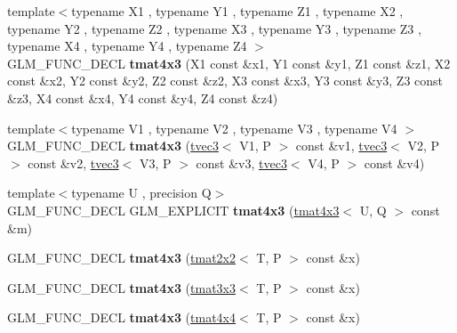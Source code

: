 \begin{DoxyCompactItemize}
\item 
\hypertarget{structglm_1_1tmat4x3_a6374ec605f3a745bec999d9dd6926a8d}{{\footnotesize template$<$typename X1 , typename Y1 , typename Z1 , typename X2 , typename Y2 , typename Z2 , typename X3 , typename Y3 , typename Z3 , typename X4 , typename Y4 , typename Z4 $>$ }\\G\-L\-M\-\_\-\-F\-U\-N\-C\-\_\-\-D\-E\-C\-L {\bfseries tmat4x3} (X1 const \&x1, Y1 const \&y1, Z1 const \&z1, X2 const \&x2, Y2 const \&y2, Z2 const \&z2, X3 const \&x3, Y3 const \&y3, Z3 const \&z3, X4 const \&x4, Y4 const \&y4, Z4 const \&z4)}\label{structglm_1_1tmat4x3_a6374ec605f3a745bec999d9dd6926a8d}

\item 
\hypertarget{structglm_1_1tmat4x3_a69caec1d2cb2b9320817a1323211d94d}{{\footnotesize template$<$typename V1 , typename V2 , typename V3 , typename V4 $>$ }\\G\-L\-M\-\_\-\-F\-U\-N\-C\-\_\-\-D\-E\-C\-L {\bfseries tmat4x3} (\hyperlink{structglm_1_1tvec3}{tvec3}$<$ V1, P $>$ const \&v1, \hyperlink{structglm_1_1tvec3}{tvec3}$<$ V2, P $>$ const \&v2, \hyperlink{structglm_1_1tvec3}{tvec3}$<$ V3, P $>$ const \&v3, \hyperlink{structglm_1_1tvec3}{tvec3}$<$ V4, P $>$ const \&v4)}\label{structglm_1_1tmat4x3_a69caec1d2cb2b9320817a1323211d94d}

\item 
\hypertarget{structglm_1_1tmat4x3_aa0103a8d29b63892bf75c1f28cccfe23}{{\footnotesize template$<$typename U , precision Q$>$ }\\G\-L\-M\-\_\-\-F\-U\-N\-C\-\_\-\-D\-E\-C\-L G\-L\-M\-\_\-\-E\-X\-P\-L\-I\-C\-I\-T {\bfseries tmat4x3} (\hyperlink{structglm_1_1tmat4x3}{tmat4x3}$<$ U, Q $>$ const \&m)}\label{structglm_1_1tmat4x3_aa0103a8d29b63892bf75c1f28cccfe23}

\item 
\hypertarget{structglm_1_1tmat4x3_a0a7982fe88164b1cc7ae9ddac2b62ac0}{G\-L\-M\-\_\-\-F\-U\-N\-C\-\_\-\-D\-E\-C\-L {\bfseries tmat4x3} (\hyperlink{structglm_1_1tmat2x2}{tmat2x2}$<$ T, P $>$ const \&x)}\label{structglm_1_1tmat4x3_a0a7982fe88164b1cc7ae9ddac2b62ac0}

\item 
\hypertarget{structglm_1_1tmat4x3_a28c08dee803c5fb0fe8c2c824f58681d}{G\-L\-M\-\_\-\-F\-U\-N\-C\-\_\-\-D\-E\-C\-L {\bfseries tmat4x3} (\hyperlink{structglm_1_1tmat3x3}{tmat3x3}$<$ T, P $>$ const \&x)}\label{structglm_1_1tmat4x3_a28c08dee803c5fb0fe8c2c824f58681d}

\item 
\hypertarget{structglm_1_1tmat4x3_ad5011e7aaaeddf6ca91742217d07a8d2}{G\-L\-M\-\_\-\-F\-U\-N\-C\-\_\-\-D\-E\-C\-L {\bfseries tmat4x3} (\hyperlink{structglm_1_1tmat4x4}{tmat4x4}$<$ T, P $>$ const \&x)}\label{structglm_1_1tmat4x3_ad5011e7aaaeddf6ca91742217d07a8d2}


\end{DoxyCompactItemize}
